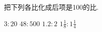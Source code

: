 把下列各比化成后项是100的比.
\begin{subquestions}
    \subquestion$3:20$   
    \subquestion$48:500$
    \subquestion$1.2:2$
    \subquestion$1\frac{1}{8}: 1\frac{1}{4}$
\end{subquestions}